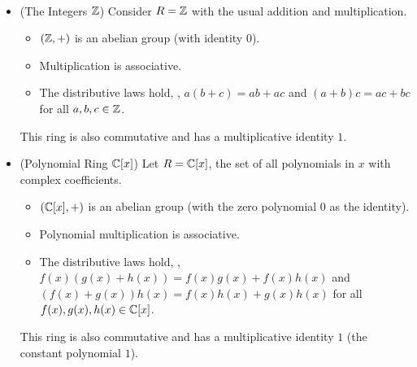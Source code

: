\documentclass[11pt,openany]{article}
\begin{document}
\begin{example}
\ \begin{itemize}
	\item (The Integers $\mathbb{Z}$) Consider $R=\mathbb{Z}$ with the usual addition and multiplication.
	\begin{itemize}
		\item $(\mathbb{Z},+)$ is an abelian group (with identity $0$).
		\item Multiplication is associative.
		\item The distributive laws hold, \ie, $a(b+c)=ab+ac$ and $(a+b)c=ac+bc$ for all $a,b,c\in\mathbb{Z}$.
	\end{itemize}
	This ring is also commutative and has a multiplicative identity $1$.
	\item (Polynomial Ring $\mathbb{C}[x]$) Let $R=\mathbb{C}[x]$, the set of all polynomials in $x$ with complex coefficients. \begin{itemize}
		\item $(\mathbb{C}[x],+)$ is an abelian group (with the zero polynomial $0$ as the identity).
		\item Polynomial multiplication is associative.
		\item The distributive laws hold, \ie, $f(x)(g(x)+h(x))=f(x)g(x)+f(x)h(x)$ and $(f(x)+g(x))h(x)=f(x)h(x)+g(x)h(x)$ for all $f(x),g(x),h(x)\in\mathbb{C}[x]$.
	\end{itemize}
	This ring is also commutative and has a multiplicative identity $1$ (the constant polynomial $1$).
\end{itemize}
\end{example}
\end{document}
